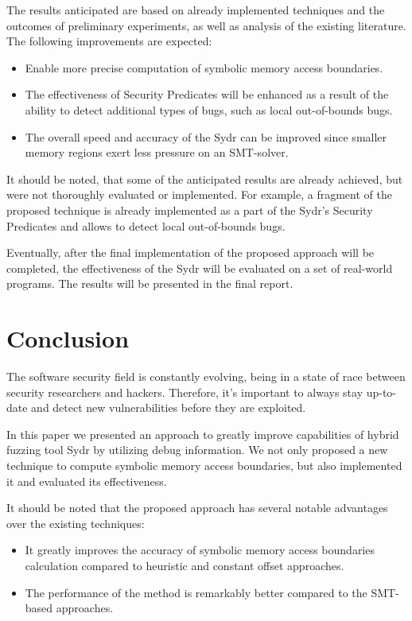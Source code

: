 \documentclass[conference]{IEEEtran}
\begin{document}
The results anticipated are based on already implemented techniques and the outcomes of preliminary experiments, as well as analysis of the existing literature. The following improvements are expected:

\begin{itemize}
    \item Enable more precise computation of symbolic memory access boundaries.
    \item The effectiveness of Security Predicates will be enhanced as a result of the ability to detect additional types of bugs, such as local out-of-bounds bugs.
    \item The overall speed and accuracy of the Sydr can be improved since smaller memory regions exert less pressure on an SMT-solver.
\end{itemize}

It should be noted, that some of the anticipated results are already achieved, but were not thoroughly evaluated or implemented. For example, a fragment of the proposed technique is already implemented as a part of the Sydr's Security Predicates and allows to detect local out-of-bounds bugs.

Eventually, after the final implementation of the proposed approach will be completed, the effectiveness of the Sydr will be evaluated on a set of real-world programs. The results will be presented in the final report.


\section{Conclusion}

The software security field is constantly evolving, being in a state of race between security researchers and hackers. Therefore, it's important to always stay up-to-date and detect new vulnerabilities before they are exploited.

In this paper we presented an approach to greatly improve capabilities of hybrid fuzzing tool Sydr by utilizing debug information. We not only proposed a new technique to compute symbolic memory access boundaries, but also implemented it and evaluated its effectiveness.

It should be noted that the proposed approach has several notable advantages over the existing techniques:
\begin{itemize}
    \item It greatly improves the accuracy of symbolic memory access boundaries calculation compared to heuristic and constant offset approaches.
    \item The performance of the method is remarkably better compared to the SMT-based approaches.
\end{itemize}
\end{document}
